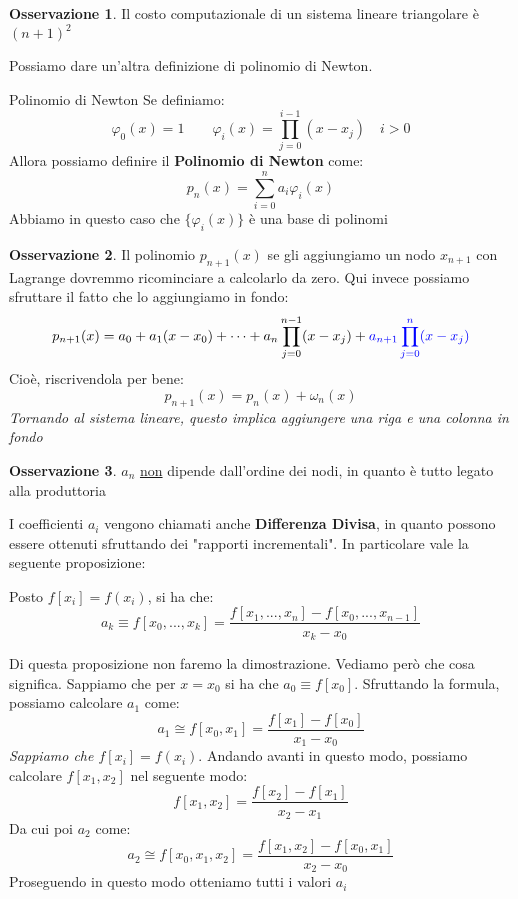 \documentclass[11pt,a4paper,twoside]{article}
\theoremstyle{definition}
\newtheorem*{oss}{Osservazione}
\begin{document}
\begin{oss}
	Il costo computazionale di un sistema lineare triangolare è $(n+1)^2$
\end{oss}

Possiamo dare un'altra definizione di polinomio di Newton.

\begin{defn}{Polinomio di Newton}{}
	Se definiamo:
	\[ \varphi_0(x) = 1 \qquad \varphi_i(x) = \prod_{j = 0}^{i-1}(x-x_j)\quad i>0 \]
	Allora possiamo definire il \textbf{Polinomio di Newton} come:
	\[ p_n(x) = \sum_{i = 0}^n a_i \varphi_i(x) \]
	Abbiamo in questo caso che $\{\varphi_i(x)\}$ è una base di polinomi
\end{defn}

\begin{oss}
	Il polinomio $p_{n+1}(x)$ se gli aggiungiamo un nodo $x_{n+1}$ con Lagrange dovremmo ricominciare a calcolarlo da zero. Qui invece possiamo sfruttare il fatto che lo aggiungiamo in fondo:
	\[ p_{n+1}(x) = a_0 + a_1(x-x_0) + \cdots + a_n \prod_{j = 0}^{n-1}(x-x_j) + {\color{blue} a_{n+1}\prod_{j = 0}^n (x-x_j)} \]
	Cioè, riscrivendola per bene:
	\[ p_{n+1}(x) = p_n(x) + \omega_n(x)\]
	\textit{Tornando al sistema lineare, questo implica aggiungere una riga e una colonna in fondo}
\end{oss}

\begin{oss}
	$a_n$ \underline{non} dipende dall'ordine dei nodi, in quanto è tutto legato alla produttoria
\end{oss}

I coefficienti $a_i$ vengono chiamati anche \textbf{Differenza Divisa}, in quanto possono essere ottenuti sfruttando dei "rapporti incrementali". In particolare vale la seguente proposizione:

\begin{prop}{}{}
	Posto $f[x_i] = f(x_i)$, si ha che:
	\[ a_k \equiv f[x_0,...,x_k] = \frac{f[x_1,...,x_n] - f[x_0,...,x_{n-1}]}{x_k - x_0} \]
\end{prop}

Di questa proposizione non faremo la dimostrazione. Vediamo però che cosa significa. Sappiamo che per $x=x_0$ si ha che $a_0 \equiv f[x_0]$. Sfruttando la formula, possiamo calcolare $a_1$ come:
\[ a_1 \cong f[x_0,x_1] = \frac{f[x_1]-f[x_0]}{x_1-x_0} \]
\textit{Sappiamo che $f[x_i]=f(x_i)$}. Andando avanti in questo modo, possiamo calcolare $f[x_1,x_2]$ nel seguente modo:
\[ f[x_1,x_2] = \frac{f[x_2]-f[x_1]}{x_2-x_1} \]
Da cui poi $a_2$ come:
\[ a_2 \cong f[x_0,x_1,x_2] = \frac{f[x_1,x_2] - f[x_0,x_1]}{x_2-x_0}\]
Proseguendo in questo modo otteniamo tutti i valori $a_i$
\end{document}
